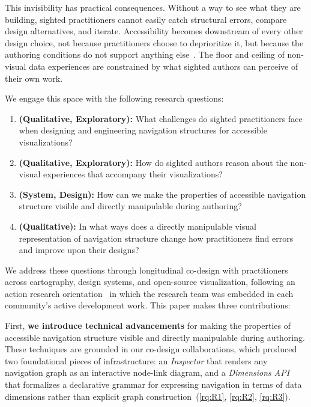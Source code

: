 \documentclass[12pt]{cmuthesis}
\begin{document}
This invisibility has practical consequences. Without a way to see what they are building, sighted practitioners cannot easily catch structural errors, compare design alternatives, and iterate. Accessibility becomes downstream of every other design choice, not because practitioners choose to deprioritize it, but because the authoring conditions do not support anything else~\cite{Joyner2022Wild, Sharif2024Challenges}. The floor and ceiling of non-visual data experiences are constrained by what sighted authors can perceive of their own work.

We engage this space with the following research questions:
\begin{enumerate}[label=\textbf{R\arabic*}, leftmargin=0pt, itemindent=!, itemsep=0pt, topsep=0.5em, parsep=0pt]
 
\item \label{rq:R1}\textbf{(Qualitative, Exploratory):} What challenges do sighted practitioners face when designing and engineering navigation structures for accessible visualizations?
 
\item \label{rq:R2}\textbf{(Qualitative, Exploratory):} How do sighted authors reason about the non-visual experiences that accompany their visualizations?
 
\item \label{rq:R3}\textbf{(System, Design):} How can we make the properties of accessible navigation structure visible and directly manipulable during authoring?
 
\item \label{rq:R4}\textbf{(Qualitative):} In what ways does a directly manipulable visual representation of navigation structure change how practitioners find errors and improve upon their designs?
 
\end{enumerate}
 
We address these questions through longitudinal co-design with practitioners across cartography, design systems, and open-source visualization, following an action research orientation~\cite{Hayes2011ActionResearch} in which the research team was embedded in each community's active development work. This paper makes three contributions:
 
First, \textbf{we introduce technical advancements} for making the properties of accessible navigation structure visible and directly manipulable during authoring. These techniques are grounded in our co-design collaborations, which produced two foundational pieces of infrastructure: an \textit{Inspector} that renders any navigation graph as an interactive node-link diagram, and a \textit{Dimensions API} that formalizes a declarative grammar for expressing navigation in terms of data dimensions rather than explicit graph construction~(\ref{rq:R1}, \ref{rq:R2}, \ref{rq:R3}).
 
\end{document}
